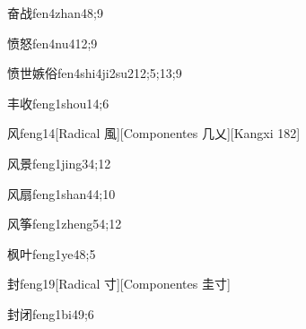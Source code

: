 \begin{verbete}{奋战}{fen4zhan4}{8;9}
\end{verbete}

\begin{verbete}{愤怒}{fen4nu4}{12;9}
\end{verbete}

\begin{verbete}{愤世嫉俗}{fen4shi4ji2su2}{12;5;13;9}
\end{verbete}

\begin{verbete}{丰收}{feng1shou1}{4;6}
\end{verbete}

\begin{verbete}{风}{feng1}{4}[Radical 風][Componentes 几乂][Kangxi 182]
\end{verbete}

\begin{verbete}{风景}{feng1jing3}{4;12}
\end{verbete}

\begin{verbete}{风扇}{feng1shan4}{4;10}
\end{verbete}

\begin{verbete}{风筝}{feng1zheng5}{4;12}
\end{verbete}

\begin{verbete}{枫叶}{feng1ye4}{8;5}
\end{verbete}

\begin{verbete}{封}{feng1}{9}[Radical 寸][Componentes 圭寸]
\end{verbete}

\begin{verbete}{封闭}{feng1bi4}{9;6}
\end{verbete}

